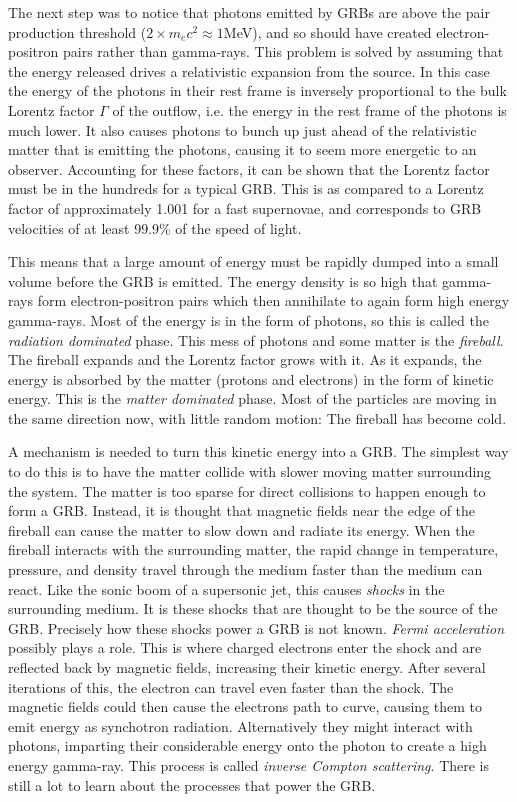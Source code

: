 \documentclass[11pt]{cuthesis}
\begin{document}
The next step was to notice that photons emitted by GRBs are above the pair production threshold ($2\times m_e c^2\approx 1$MeV), and so should have created electron-positron pairs rather than gamma-rays. This problem is solved by assuming that the energy released drives a relativistic expansion from the source. In this case the energy of the photons in their rest frame is inversely proportional to the bulk Lorentz factor $\Gamma$ of the outflow, i.e. the energy in the rest frame of the photons is much lower. It also causes photons to bunch up just ahead of the relativistic matter that is emitting the photons, causing it to seem more energetic to an observer. Accounting for these factors, it can be shown that the Lorentz factor must be in the hundreds for a typical GRB. This is as compared to a Lorentz factor of approximately 1.001 for a fast supernovae, and corresponds to GRB velocities of at least 99.9\% of the speed of light. 

This means that a large amount of energy must be rapidly dumped into a small volume before the GRB is emitted. The energy density is so high that gamma-rays form electron-positron pairs which then annihilate to again form high energy gamma-rays. Most of the energy is in the form of photons, so this is called the \textit{radiation dominated} phase. This mess of photons and some matter is the \textit{fireball}. The fireball expands and the Lorentz factor grows with it. As it expands, the energy is absorbed by the matter (protons and electrons) in the form of kinetic energy. This is the \textit{matter dominated} phase. Most of the particles are moving in the same direction now, with little random motion: The fireball has become cold. 

A mechanism is needed to turn this kinetic energy into a GRB. The simplest way to do this is to have the matter collide with slower moving matter surrounding the system. The matter is too sparse for direct collisions to happen enough to form a GRB. Instead, it is thought that magnetic fields near the edge of the fireball can cause the matter to slow down and radiate its energy. When the fireball interacts with the surrounding matter, the rapid change in temperature, pressure, and density travel through the medium faster than the medium can react. Like the sonic boom of a supersonic jet, this causes \textit{shocks} in the surrounding medium. It is these shocks that are thought to be the source of the GRB. Precisely how these shocks power a GRB is not known. \textit{Fermi acceleration} possibly plays a role. This is where charged electrons enter the shock and are reflected back by magnetic fields, increasing their kinetic energy. After several iterations of this, the electron can travel even faster than the shock. The magnetic fields could then cause the electrons path to curve, causing them to emit energy as synchotron radiation. Alternatively they might interact with photons, imparting their considerable energy onto the photon to create a high energy gamma-ray. This process is called \textit{inverse Compton scattering}. There is still a lot to learn about the processes that power the GRB.
\end{document}
